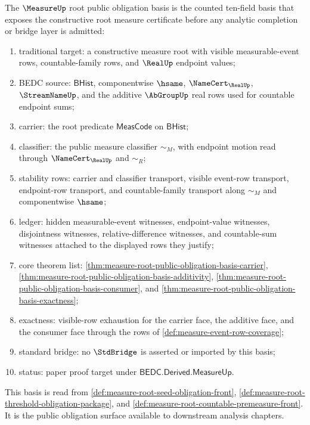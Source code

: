 \begin{definition}
\label{def:measure-root-public-obligation-basis}
The $\MeasureUp$ root public obligation basis is the counted ten-field basis
that exposes the constructive root measure certificate before any analytic
completion or bridge layer is admitted:
\begin{enumerate}
  \item traditional target: a constructive measure root with visible
  measurable-event rows, countable-family rows, and $\RealUp$ endpoint
  values;
  \item BEDC source: $\mathsf{BHist}$, componentwise $\hsame$,
  $\NameCert_{\RealUp}$, $\StreamNameUp$, and the additive $\AbGroupUp$ real
  rows used for countable endpoint sums;
  \item carrier: the root predicate $\mathsf{MeasCode}$ on
  $\mathsf{BHist}$;
  \item classifier: the public measure classifier $\sim_M$, with endpoint
  motion read through $\NameCert_{\RealUp}$ and $\sim_R$;
  \item stability rows: carrier and classifier transport, visible event-row
  transport, endpoint-row transport, and countable-family transport along
  $\sim_M$ and componentwise $\hsame$;
  \item ledger: hidden measurable-event witnesses, endpoint-value witnesses,
  disjointness witnesses, relative-difference witnesses, and countable-sum
  witnesses attached to the displayed rows they justify;
  \item core theorem list:
  \autoref{thm:measure-root-public-obligation-basis-carrier},
  \autoref{thm:measure-root-public-obligation-basis-additivity},
  \autoref{thm:measure-root-public-obligation-basis-consumer}, and
  \autoref{thm:measure-root-public-obligation-basis-exactness};
  \item exactness: visible-row exhaustion for the carrier face, the additive
  face, and the consumer face through the rows of
  \autoref{def:measure-event-row-coverage};
  \item standard bridge: no $\StdBridge$ is asserted or imported by this
  basis;
  \item status: paper proof target under
  $\mathsf{BEDC.Derived.MeasureUp}$.
\end{enumerate}
This basis is read from
\autoref{def:measure-root-seed-obligation-front},
\autoref{def:measure-root-threshold-obligation-package}, and
\autoref{def:measure-root-countable-premeasure-front}. It is the public
obligation surface available to downstream analysis chapters.
\end{definition}

